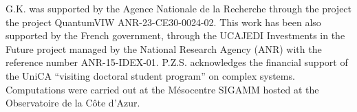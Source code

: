 \documentclass[%
 reprint,
 amsmath,amssymb,
 aps,
 prl,
]{revtex4-2}
\begin{document}
{\begin{acknowledgments}
    G.K. was supported by the Agence Nationale de la Recherche through the project the project QuantumVIW ANR-23-CE30-0024-02.
    This work has been also supported by the French government, through the UCAJEDI Investments in the Future project managed by the National Research Agency (ANR) with the reference number ANR-15-IDEX-01. P.Z.S. acknowledges the financial support of the UniCA ``visiting doctoral student program'' on complex systems. Computations were carried out at the Mésocentre SIGAMM hosted at the Observatoire de la Côte d’Azur.

  \end{acknowledgments}




}
\end{document}
